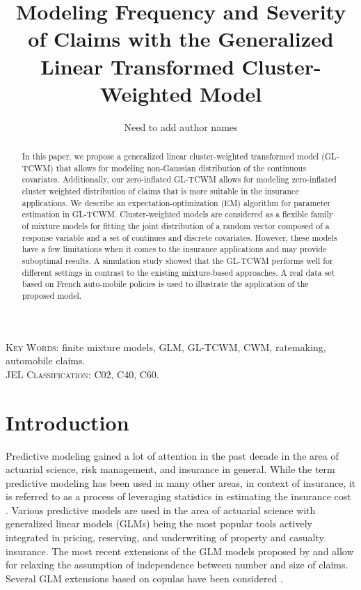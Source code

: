 \documentclass[11pt,letterpaper]{article}
\numberwithin{equation}{section}
\numberwithin{equation}{section}
\numberwithin{equation}{section}
\begin{document}
\title{\bf Modeling  Frequency and Severity of Claims with the Generalized Linear Transformed Cluster-Weighted Model}

\author{Need to add author names}%

\maketitle
\doublespacing
\small

\begin{abstract}

In this paper, we propose a generalized linear cluster-weighted transformed model (GL-TCWM) that allows for modeling non-Gaussian distribution of the continuous covariates. Additionally, our zero-inflated GL-TCWM allows for modeling zero-inflated cluster weighted distribution of claims that is more suitable in the insurance applications. We describe an expectation-optimization (EM) algorithm for parameter estimation in GL-TCWM. Cluster-weighted models are considered as a flexible family of mixture models for fitting the joint distribution of a random vector composed of a response variable and a set of continues and discrete covariates. However, these models have a few limitations when it comes to the insurance applications and may provide suboptimal results. A simulation study showed that the GL-TCWM performs well for different settings in contrast to the existing mixture-based approaches. A real data set based on French auto-mobile policies is used to illustrate the application of the proposed model.

\end{abstract}
\textsc{Key Words:} finite mixture models, GLM, GL-TCWM, CWM, ratemaking, automobile claims.\\
\textsc{JEL Classification:}  C02, C40, C60.\\
\section{Introduction}\label{sec:introduction}
Predictive modeling gained a lot of attention in the past decade in the area of actuarial science, risk management, and insurance in general. While the term predictive modeling has been used in many other areas, in context of insurance, it is referred to as a process of leveraging statistics in estimating the insurance cost \citep[see][]{Frees+Derrig+Meyer:2014}. Various predictive models are used in the area of actuarial science with generalized linear models (GLMs) being the most popular tools actively integrated in pricing, reserving, and underwriting of property and casualty insurance. The most recent extensions of the GLM models proposed by \cite{Garrido+Genest+Schulz:2016} and \cite{Shi+Feng+Ivantsova:2015} allow for relaxing the assumption of independence between number and size of claims. Several GLM extensions based on copulas have been considered \citep[e.g.,][]{Frees+Lee+Yang:2016,Kramer+Brechmann+Silvestrini+Czado:2013, Czado+Kastenmeier+Brechmann+Min:2012,Frees+Wang:2006}.
\end{document}
